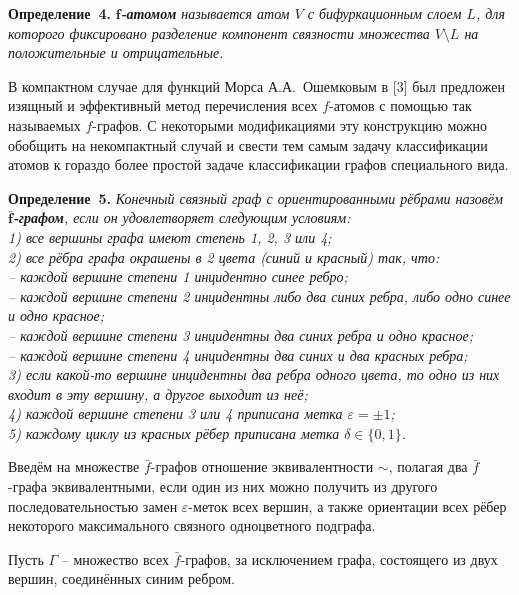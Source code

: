 
\textbf{Определение~4.}
{\it \textbf{$\mathbf f$-атомом} называется атом $V$ с бифуркационным слоем $L$, для которого фиксировано разделение компонент связности множества $V\setminus L$ на положительные и отрицательные.}

В компактном случае для функций Морса А.А.~Ошемковым в [3] был предложен изящный и эффективный метод перечисления всех $f$-атомов с помощью так называемых $f$-графов. С некоторыми модификациями эту конструкцию можно обобщить на некомпактный случай и свести тем самым задачу классификации атомов к гораздо более простой задаче классификации графов специального вида.

\textbf{Определение~5.}
{\it Конечный связный граф с ориентированными рёбрами назовём \textbf{$\mathbf{\bar f}$-графом}, если он удовлетворяет следующим условиям:\\
 1) все вершины графа имеют степень 1, 2, 3 или 4;\\
 2) все рёбра графа окрашены в 2 цвета (синий и красный) так, что:\\
		-- каждой вершине степени 1 инцидентно синее ребро;\\
		-- каждой вершине степени 2 инцидентны либо два синих ребра, либо одно синее и одно красное;\\
		-- каждой вершине степени 3 инцидентны два синих ребра и одно красное;\\
		-- каждой вершине степени 4 инцидентны два синих и два красных ребра;\\
	3) если какой-то вершине инцидентны два ребра одного цвета, то одно из них входит в эту вершину, а другое выходит из неё; \\
	4) каждой вершине степени 3 или 4 приписана метка $\varepsilon=\pm1$;\\
	5) каждому циклу из красных рёбер приписана метка $\delta\in\{0,1\}$.
}

Введём на множестве $\bar f$-графов отношение эквивалентности $\sim$, полагая два $\bar f$-графа эквивалентными, если один из них можно получить из другого последовательностью замен $\varepsilon$-меток всех вершин, а также ориентации всех рёбер некоторого максимального связного одноцветного подграфа.

Пусть $\mathfrak\Gamma$ -- множество всех $\bar f$-графов, за исключением графа, состоящего из двух вершин, соединённых синим ребром.

